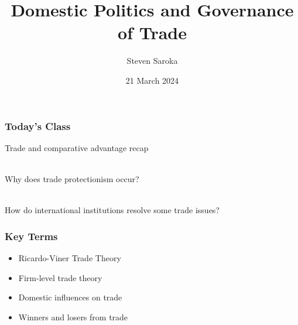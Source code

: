 \documentclass[handout]{beamer}
\title[Domestic Politics of Trade]{\LARGE{Domestic Politics and Governance of Trade}}
\author[POLI 150]{Steven Saroka}
\institute{POLI 150}
\date{21 March 2024}
\begin{document}
\begin{frame}
\titlepage %
\end{frame}











\begin{frame} 
	\frametitle{\LARGE{Today's Class}}
	\begin{itemize}
		\Large{
			\item Trade and comparative advantage recap 
			\\~\\ 
			\item Why does trade protectionism occur? 
			\\~\\
			\item How do international institutions resolve some trade issues? 
		}
	\end{itemize}
\end{frame}

\begin{frame} 
	\frametitle{\LARGE{Key Terms}}
	\begin{itemize}
		\item Ricardo-Viner Trade Theory
		\item Firm-level trade theory
		\item Domestic influences on trade
		\item Winners and losers from trade
	\end{itemize}
\end{frame}
\end{document}

